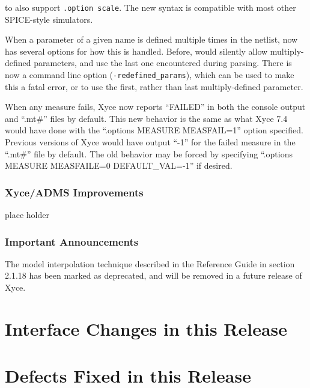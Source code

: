 \documentclass[letterpaper]{scrartcl}
\begin{document}
\begin{XyceItemize}
   to also support \texttt{.option scale}.  The new syntax is
   compatible with most other SPICE-style simulators.
 \item When a parameter of a given name is defined multiple times in
   the netlist, \Xyce{} now has several options for how this is
   handled.  Before, \Xyce{} would silently allow multiply-defined
   parameters, and use the last one encountered during parsing.  There
   is now a command line option (\texttt{-redefined\_params}), which
   can be used to make this a fatal error, or to use the first, rather
   than last multiply-defined parameter.
 \item When any measure fails, Xyce now reports ``FAILED'' in both the
   console output and ``.mt\#'' files by default.  This new behavior is
   the same as what Xyce 7.4 would have done with the ``.options
   MEASURE MEASFAIL=1'' option specified.  Previous versions of Xyce
   would have output ``-1'' for the failed measure in the ``.mt\#''
   file by default.  The old behavior may be forced by specifying
   ``.options MEASURE MEASFAILE=0 DEFAULT\_VAL=-1'' if desired.
\end{XyceItemize}

\subsubsection*{Xyce/ADMS Improvements}
\begin{XyceItemize}
  \item place holder
\end{XyceItemize}

\subsubsection*{Important Announcements}
\begin{XyceItemize}
\item The model interpolation technique described in the \Xyce{}
  Reference Guide in section 2.1.18 has been marked as deprecated, and
  will be removed in a future release of Xyce.
\end{XyceItemize}

\newpage
\section{Interface Changes in this Release}


\newpage
\section{Defects Fixed in this Release}

\end{document}
